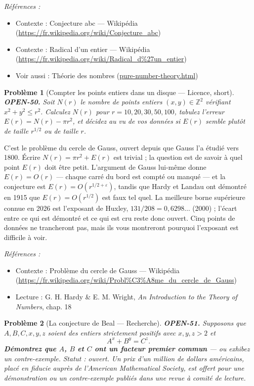 \documentclass[11pt]{article}
\newtheorem{problem}{Problème}
\newenvironment{refs}{\par\small\noindent\emph{Références :}\begin{itemize}\setlength\itemsep{0pt}}{\end{itemize}\normalsize}
\begin{document}
\begin{refs}
\item Contexte : Conjecture abc --- Wikipédia (\url{https://fr.wikipedia.org/wiki/Conjecture_abc})
\item Contexte : Radical d'un entier --- Wikipédia (\url{https://fr.wikipedia.org/wiki/Radical_d%27un_entier})
\item Voir aussi : Théorie des nombres (\url{pure-number-theory.html})
\end{refs}

\bigskip

\begin{problem}[{Compter les points entiers dans un disque --- Licence, short}]
\textbf{OPEN-50.} Soit $ N(r) $ le nombre de points entiers
$ (x,y) \in \mathbb{Z}^2 $ vérifiant $ x^2 + y^2 \leq r^2 $. Calculez $ N(r) $ pour
$ r = 10, 20, 30, 50, 100 $, tabulez l'erreur $ E(r) = N(r) - \pi r^2 $, et décidez au
vu de vos données si $ E(r) $ semble plutôt de taille $ r^{1/2} $ ou de taille
$ r $.
\end{problem}

\noindent C'est le problème du cercle de Gauss, ouvert depuis que Gauss l'a
étudié vers 1800. Écrire $ N(r) = \pi r^2 + E(r) $ est trivial ; la question est de
savoir à quel point $ E(r) $ doit être petit. L'argument de Gauss lui-même donne
$ E(r) = O(r) $ --- chaque carré du bord est compté ou manqué --- et la conjecture est
$ E(r) = O(r^{1/2 + \varepsilon}) $, tandis que Hardy et Landau ont démontré en 1915 que
$ E(r) = O(r^{1/2}) $ est faux tel quel. La meilleure borne supérieure connue en 2026
est l'exposant de Huxley, $ 131/208 = 0{,}6298\ldots $ (2000) ; l'écart entre ce qui est
démontré et ce qui est cru reste donc ouvert. Cinq points de données ne trancheront pas,
mais ils vous montreront pourquoi l'exposant est difficile à voir.

\begin{refs}
\item Contexte : Problème du cercle de Gauss --- Wikipédia (\url{https://fr.wikipedia.org/wiki/Probl%C3%A8me_du_cercle_de_Gauss})
\item Lecture : G. H. Hardy \& E. M. Wright, \textit{An Introduction to the Theory of Numbers}, chap. 18
\end{refs}

\bigskip

\begin{problem}[{La conjecture de Beal --- Recherche}]
\textbf{OPEN-51.} Supposons que $ A, B, C, x, y, z $ soient des
entiers strictement positifs avec $ x, y, z > 2 $ et
\[ A^{x} + B^{y} = C^{z} . \]
\textbf{Démontrez que $ A $, $ B $ et $ C $ ont un facteur premier commun} --- ou
exhibez un contre-exemple. Statut : ouvert. Un prix d'un million de dollars américains,
placé en fiducie auprès de l'American Mathematical Society, est offert pour une
démonstration ou un contre-exemple publiés dans une revue à comité de lecture.
\end{problem}
\end{document}

